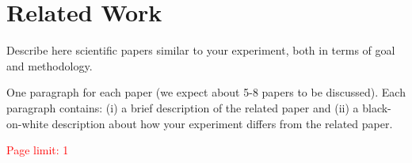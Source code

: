 \section{Related Work}\label{sec:related}

    Describe here scientific papers similar to your experiment, both in terms of goal and methodology. 

One paragraph for each paper (we expect about 5-8 papers to be discussed). Each paragraph contains: (i) a brief description of the related paper and (ii) a black-on-white description about how your experiment differs from the related paper.

\textcolor{red}{Page limit: 1}